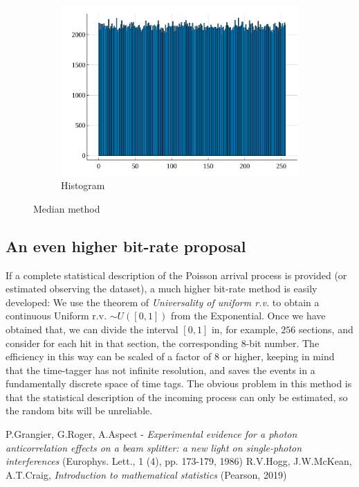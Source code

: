 \documentclass[10pt, final]{article}
\begin{document}
\begin{multicols}{2}
\begin{mdframed}
\begin{figure}[H]
        \begin{subfigure}{\textwidth}
            \centering
            \includegraphics[width = \textwidth]{../random_img/naif-histogram.pdf}
            \caption{Histogram}
        \end{subfigure}
        \caption{Median method}
        \label{median}
    \end{figure}
\end{mdframed}


\subsection*{An even higher bit-rate proposal}
If a complete statistical description of the Poisson arrival process is provided (or estimated observing the dataset), a much higher bit-rate method is easily developed:
We use the theorem of \emph{Universality of uniform r.v.} to obtain a continuous Uniform r.v. $\sim U([0, 1])$ from the Exponential. Once we have obtained that, we can divide the interval $[0, 1]$ in, for example, $256$ sections, and consider for each hit in that section, the corresponding $8$-bit number. The efficiency in this way can be scaled of a factor of $8$ or higher, keeping in mind that the time-tagger has not infinite resolution, and saves the events in a fundamentally discrete space of time tags.
The obvious problem in this method is that the statistical description of the incoming process can only be estimated, so the random bits will be unreliable.



\begin{thebibliography}{99}
   P.Grangier, G.Roger, A.Aspect - \emph{Experimental evidence for a photon anticorrelation effects on a beam splitter: a new light on single-photon interferences} (Europhys. Lett., 1 (4), pp. 173-179, 1986)
   R.V.Hogg, J.W.McKean, A.T.Craig, \emph{Introduction to mathematical statistics} (Pearson, 2019)
\end{thebibliography}
\end{multicols}
\end{document}

